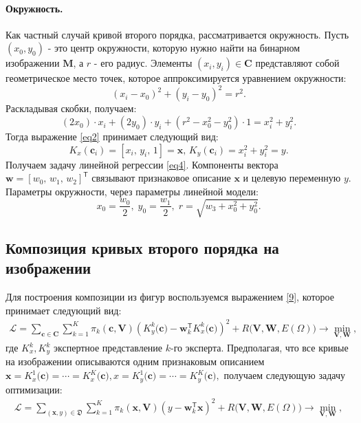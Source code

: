 \paragraph{Окружность.} Как частный случай кривой второго порядка, рассматривается окружность.
Пусть $(x_0, y_0)$ - это центр окружности, которую нужно найти на бинарном изображении $\mathbf{M}$, а $r$ - его радиус.
Элементы $(x_i, y_i)\in\mathbf{C}$ представляют собой геометрическое место точек, которое аппроксимируется уравнением окружности:
\[
(x_i - x_0)^2 + (y_i - y_0)^2 = r^2.
\]
Раскладывая скобки, получаем:
\[(2x_0)\cdot x_i + (2y_0)\cdot y_i + (r^2 - x_0^2 - y_0^2)\cdot 1 = x_i^2 + y_i^2 . 
\]
Тогда выражение \eqref{eq2} принимает следующий вид:
\[
\label{10}
K_{x}(\mathbf{c}_i) = [x_i, \, y_i, \, 1] = \mathbf{x}, \,  K_{y}(\mathbf{c}_i) = x_i^2+y_i^2 = y.
\] 
Получаем задачу линейной регрессии \eqref{eq4}.
Компоненты вектора $\mathbf{w} = [w_0, \, w_1, \, w_2]^\mathsf{T}$ связывают признаковое описание $\mathbf{x}$ и целевую переменную $y$. Параметры окружности, через параметры линейной модели: \[ x_0 = \frac{w_0}{2}, \; y_0 = \frac{w_1}{2}, \; r = \sqrt{w_3 + x_0^2 + y_0 ^2}.\]

\subsection{Композиция кривых второго порядка на изображении}
\label{sec:4}
Для построения композиции из фигур воспользуемся выражением \eqref{9}, которое принимает следующий вид:
\[ 
\label{statment:optim:task}
\begin{aligned}
\mathcal{L} = \sum\limits_{\mathbf{c} \in \mathbf{C}} \sum\limits_{k = 1}^{K} \pi_k(\mathbf{c}, \mathbf{V})\left(K^{k}_y\bigr(\mathbf{c}\bigr) - \mathbf{w}_k^{\mathsf{T}}K^{k}_x\bigr(\mathbf{c}\bigr)\right)^2 + R\bigl(\mathbf{V}, \mathbf{W}, E(\Omega)\bigr) \rightarrow \min_{\mathbf{V}, \mathbf{W}},
\end{aligned}
\] 
где $K^{k}_x, K^{k}_y$ экспертное представление $k$-го эксперта. Предполагая, что все кривые на изображении описываются одним признаковым описанием $\mathbf{x} =K^{1}_x\bigr(\mathbf{c}\bigr)=\cdots=K^{K}_x\bigr(\mathbf{c}\bigr), x= K^{1}_y\bigr(\mathbf{c}\bigr)=\cdots=K^{K}_y\bigr(\mathbf{c}\bigr),$ получаем следующую задачу оптимизации:
\[ 
\label{statment:optim:task:simp}
\begin{aligned}
\mathcal{L} = \sum\limits_{\left(\mathbf{x}, y\right) \in \mathfrak{D}} \sum\limits_{k = 1}^{K} \pi_k(\mathbf{x}, \mathbf{V})\left(y - \mathbf{w}_k^{\mathsf{T}}\mathbf{x}\right)^2 + R\bigl(\mathbf{V}, \mathbf{W}, E(\Omega)\bigr) \rightarrow \min_{\mathbf{V}, \mathbf{W}},
\end{aligned}
\] 


